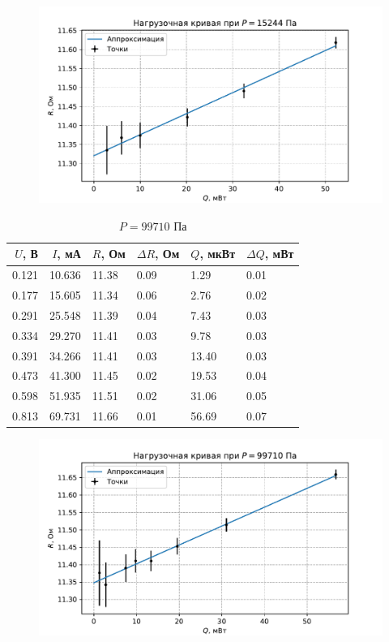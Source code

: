 \begin{figure}[H]\centering\includegraphics[width=\textwidth]{graphs/RQ15243.64502645898.pdf}\end{figure}\begin{table}[H]
\centering
\caption{$P = 99710$ Па}
\begin{tabular}{rrllll}
\hline
 $U$, В &  $I$, мА &     $R$, Ом & $\Delta R$, Ом &     $Q$, мкВт & $\Delta Q$, мВт \\ \hline
0.121 & 10.636 & 11.38 &           0.09 &  1.29 &            0.01 \\ \hline
0.177 & 15.605 & 11.34 &           0.06 &  2.76 &            0.02 \\ \hline
0.291 & 25.548 & 11.39 &           0.04 &  7.43 &            0.03 \\ \hline
0.334 & 29.270 & 11.41 &           0.03 &  9.78 &            0.03 \\ \hline
0.391 & 34.266 & 11.41 &           0.03 & 13.40 &            0.03 \\ \hline
0.473 & 41.300 & 11.45 &           0.02 & 19.53 &            0.04 \\ \hline
0.598 & 51.935 & 11.51 &           0.02 & 31.06 &            0.05 \\ \hline
0.813 & 69.731 & 11.66 &           0.01 & 56.69 &            0.07 \\ \hline
\end{tabular}
\end{table}
\begin{figure}[H]\centering\includegraphics[width=\textwidth]{graphs/RQ99710.0.pdf}\end{figure}